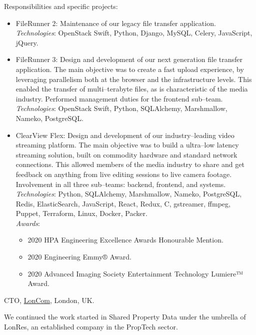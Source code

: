 \documentclass[11pt]{article}
\newcommand{\years}[1]{\marginnote{\scriptsize #1}}
\begin{document}
Responsibilities and specific projects:
\begin{itemize}
	\item  FileRunner 2: Maintenance of our legacy file transfer application.\\
	\textit{Technologies}: OpenStack Swift, Python, Django, MySQL, Celery, JavaScript, jQuery.
	\item  FileRunner 3: Design and development of our next generation file transfer application. The main objective was to create a fast upload experience, by leveraging parallelism both at the browser and the infrastructure levels. This enabled the transfer of multi--terabyte files, as is characteristic of the media industry. Performed management duties for the frontend sub--team.\\
	\textit{Technologies}: OpenStack Swift, Python, SQLAlchemy, Marshmallow, Nameko, PostgreSQL.
	\item  {ClearView Flex}: Design and development of our industry--leading video streaming platform. The main objective was to build a ultra--low latency streaming solution, built on commodity hardware and standard network connections. This allowed members of the media industry to share and get feedback on anything from live editing sessions to live camera footage. Involvement in all three sub--teams: backend, frontend, and systems.\\
	\textit{Technologies}: Python, SQLAlchemy, Marshmallow, Nameko, PostgreSQL, Redis, ElasticSearch, JavaScript, React, Redux, C, gstreamer, ffmpeg, Puppet, Terraform, Linux, Docker, Packer.\\
	\textit{Awards}:
	\begin{itemize}
		\item 2020 HPA Engineering Excellence Awards Honourable Mention.
		\item 2020 Engineering Emmy® Award.
		\item 2020 Advanced Imaging Society Entertainment Technology Lumiere™ Award.
	\end{itemize}
\end{itemize}

\years{2017--2018}\textsc{CTO}, \href{http://loncom.com}{LonCom}, London, UK.

We continued the work started in Shared Property Data under the umbrella of LonRes, an established company in the PropTech sector.
\end{document}
